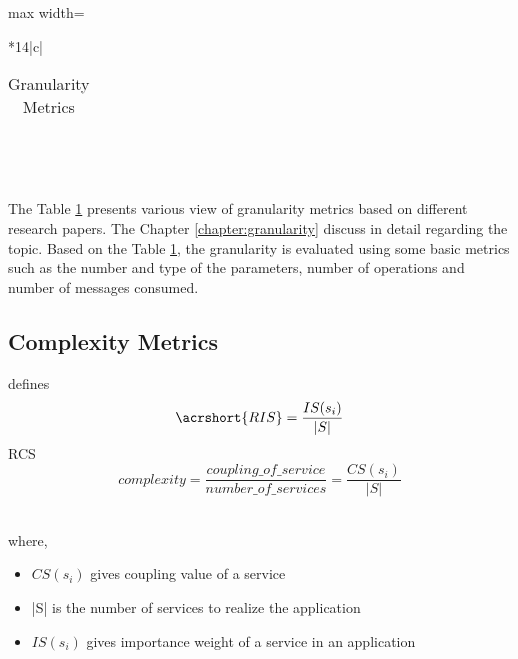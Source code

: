 {{{{\begin{table}[h!]
\begin{adjustbox}{max width=\textwidth}
\begin{tabular}{*{14}{|c}|}
\begin{tabular}{cl}
                    \end{tabular}\\
                    \hline
\end{tabular}
\end{adjustbox}
  \caption{Granularity Metrics}
  \label{tab:quality_of_service/quality_attributes/granularity_metrics}
\end{table}
\\
The Table \ref{tab:quality_of_service/quality_attributes/granularity_metrics} presents various view of granularity metrics based on different research papers. The Chapter \ref{chapter:granularity} discuss in detail regarding the topic. Based on the Table \ref{tab:quality_of_service/quality_attributes/granularity_metrics}, the granularity is evaluated using some basic metrics such as the number and type of the parameters, number of operations and number of messages consumed.
\\

\subsection{Complexity Metrics}{\label{section:quality_of_service/quality_metrics/complexity}

\cite{Zhang:2009aa} defines
$$ \acrshort{RIS} = \frac{IS(s_i)}{|S|}$$
\acrshort{RCS}
\\

$$  complexity = \frac{coupling\_of\_service}{number\_of\_services} = \frac{CS(s_i)}{|S|}$$

\\
where,
\\
\begin{itemize}[leftmargin=.5in]
\item $CS(s_i)$ gives coupling value of a service
\item |S| is the number of services to realize the application
\item $IS(s_i)$ gives importance weight of a service in an application
\end{itemize}

}}}}}
